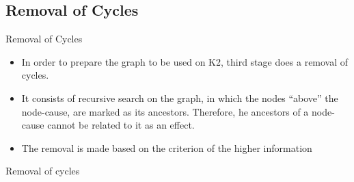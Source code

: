 \subsection{Removal of Cycles}
\begin{frame}{Removal of Cycles}
    \begin{itemize}
        \item { In order to prepare the graph to be used on K2, third stage does a removal of cycles.}
        \item It consists of recursive search on the graph, in which the nodes “above” the node-cause, are marked as its ancestors. Therefore, he ancestors of a node-cause cannot be related to it as an effect.
        \item {The removal is made based on the criterion of the higher information}
    \end{itemize}

\end{frame}


\begin{frame}{Removal of cycles}
    
\end{frame}


